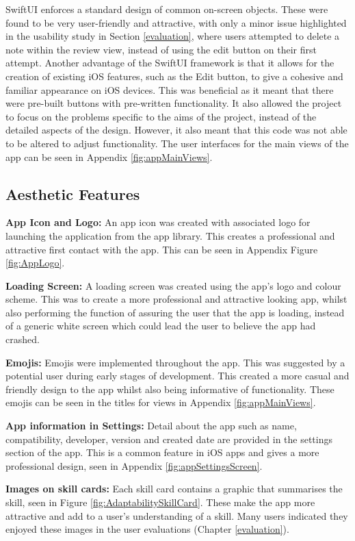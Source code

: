 \documentclass{l4proj}
\begin{document}
SwiftUI enforces a standard design of common on-screen objects. These were found to be very user-friendly and attractive, with only a minor issue highlighted in the usability study in Section \ref{evaluation}, where users attempted to delete a note within the review view, instead of using the edit button on their first attempt. Another advantage of the SwiftUI framework is that it allows for the creation of existing iOS features, such as the Edit button, to give a cohesive and familiar appearance on iOS devices. This was beneficial as it meant that there were pre-built buttons with pre-written functionality. It also allowed the project to focus on the problems specific to the aims of the project, instead of the detailed aspects of the design. However, it also meant that this code was not able to be altered to adjust functionality. The user interfaces for the main views of the app can be seen in Appendix \ref{fig:appMainViews}.

\subsection{Aesthetic Features}

\textbf{App Icon and Logo:} An app icon was created with associated logo for launching the application from the app library. This creates a professional and attractive first contact with the app. This can be seen in Appendix Figure \ref{fig:AppLogo}.

\textbf{Loading Screen:} A loading screen was created using the app’s logo and colour scheme. This was to create a more professional and attractive looking app, whilst also performing the function of assuring the user that the app is loading, instead of a generic white screen which could lead the user to believe the app had crashed.

\textbf{Emojis:} Emojis were implemented throughout the app. This was suggested by a potential user during early stages of development. This created a more casual and friendly design to the app whilst also being informative of functionality. These emojis can be seen in the titles for views in Appendix \ref{fig:appMainViews}.

\textbf{App information in Settings:} Detail about the app such as name, compatibility, developer, version and created date are provided in the settings section of the app. This is a common feature in iOS apps and gives a more professional design, seen in Appendix \ref{fig:appSettingsScreen}.

\textbf{Images on skill cards:} Each skill card contains a graphic that summarises the skill, seen in Figure \ref{fig:AdaptabilitySkillCard}. These make the app more attractive and add to a user's understanding of a skill. Many users indicated they enjoyed these images in the user evaluations (Chapter \ref{evaluation}).
\end{document}
